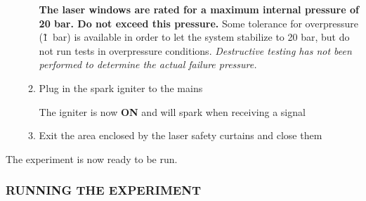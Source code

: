 \begin{enumerate}
\begin{enumerate}

    \warningsymbol \textbf{The
    laser windows are rated for a maximum internal pressure of 20 bar.
    Do not exceed this
    pressure.}
    Some tolerance for overpressure (\~1~bar) is available
    in order to let the system stabilize to 20 bar, but do not run tests
    in overpressure conditions. \emph{Destructive testing has not been
    performed to determine the actual failure pressure.}
  \item
    Plug in the spark igniter to the mains

    \warningsymbol The igniter is now \textbf{ON} and will spark when receiving a
    signal
  \item
    Exit the area enclosed by the laser safety curtains and close them
  \end{enumerate}
\end{enumerate}

The experiment is now ready to be run.

\subsubsection{RUNNING THE EXPERIMENT}\label{running-the-experiment}


